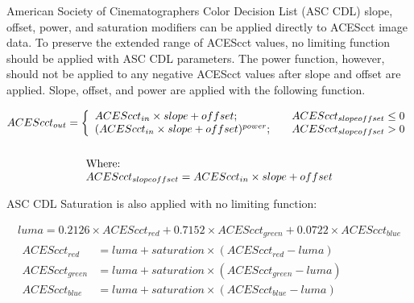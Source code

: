 \label{appendixA}

American Society of Cinematographers Color Decision List (ASC CDL) slope, offset, power, and saturation modifiers can be applied directly to ACEScct image data. To preserve the extended range of ACEScct values, no limiting function should be applied with ASC CDL parameters. The power function, however, should not be applied to any negative ACEScct values after slope and offset are applied. Slope, offset, and power are applied with the following function.

\begin{gather*} 
    ACEScct_{out} = \left\{ 
    \begin{array}{l r }
        ACEScct_{in} \times slope + offset; & \quad ACEScct_{slopeoffset} \leq 0 \\
        (ACEScct_{in} \times slope + offset)^{power}; & \quad ACEScct_{slopeoffset} > 0 \\
    \end{array} \right. \\ 
    \\
    \begin{array}{l}
    \text{Where:}\\
    ACEScct_{slopeoffset} = ACEScct_{in} \times slope + offset
    \end{array}
\end{gather*}

ASC CDL Saturation is also applied with no limiting function:

\begin{gather*}
    luma = 0.2126 \times ACEScct_{red} + 0.7152 \times ACEScct_{green} + 0.0722 \times ACEScct_{blue} \\
    \begin{aligned}
        ACEScct_{red} &= luma + saturation \times (ACEScct_{red} - luma) \\
        ACEScct_{green} &= luma + saturation \times (ACEScct_{green} - luma) \\        
        ACEScct_{blue} &= luma + saturation \times (ACEScct_{blue} - luma) \\ 
    \end{aligned}
\end{gather*}
    